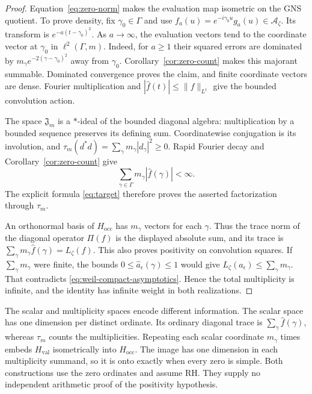 \documentclass[11pt]{article}
\theoremstyle{definition}
\theoremstyle{remark}
\numberwithin{equation}{section}
\newcommand{\cA}{\mathcal A}
\begin{document}
\begin{proof}
Equation~\eqref{eq:zero-norm} makes the evaluation map isometric on
the GNS quotient.  To prove density, fix $\gamma_0\in\Gamma$ and use
$f_a(u)=e^{-i\gamma_0u}g_a(u)\in\cA_\zeta$.
Its transform is $e^{-a(t-\gamma_0)^2}$.
As $a\to\infty$, the evaluation vectors tend to the coordinate vector
at $\gamma_0$ in $\ell^2(\Gamma,m)$.
Indeed, for $a\geq1$ their squared errors are dominated by
$m_\gamma e^{-2(\gamma-\gamma_0)^2}$ away from $\gamma_0$.
Corollary~\ref{cor:zero-count} makes this majorant summable.
Dominated convergence proves the claim, and finite coordinate vectors
are dense.  Fourier multiplication and
$|\widehat f(t)|\leq\|f\|_{L^1}$ give the bounded convolution action.

The space $\mathfrak J_m$ is a $*$-ideal of the bounded diagonal algebra:
multiplication by a bounded sequence preserves its defining sum.
Coordinatewise conjugation is its involution, and
$\tau_m(d^*d)=\sum_\gamma m_\gamma|d_\gamma|^2\geq0$.
Rapid Fourier decay and Corollary~\ref{cor:zero-count} give
\[
 \sum_{\gamma\in\Gamma}m_\gamma|\widehat f(\gamma)|<\infty.
\]
The explicit formula \eqref{eq:target} therefore proves the asserted
factorization through $\tau_m$.

An orthonormal basis of $H_{\mathrm{occ}}$ has $m_\gamma$ vectors for
each $\gamma$.  Thus the trace norm of the diagonal operator $\Pi(f)$
is the displayed absolute sum, and its trace is
$\sum_\gamma m_\gamma\widehat f(\gamma)=L_\zeta(f)$.
This also proves positivity on convolution squares.
If $\sum_\gamma m_\gamma$ were finite, the bounds
$0\leq\widehat a_\epsilon(\gamma)\leq1$ would give
$L_\zeta(a_\epsilon)\leq\sum_\gamma m_\gamma$.
That contradicts \eqref{eq:weil-compact-asymptotics}.
Hence the total multiplicity is infinite, and the identity has infinite
weight in both realizations.
\end{proof}

The scalar and multiplicity spaces encode different information.
The scalar space has one dimension per distinct ordinate.
Its ordinary diagonal trace is $\sum_\gamma\widehat f(\gamma)$,
whereas $\tau_m$ counts the multiplicities.
Repeating each scalar coordinate $m_\gamma$ times embeds
$H_{\mathrm{val}}$ isometrically into $H_{\mathrm{occ}}$.
The image has one dimension in each multiplicity summand, so it is
onto exactly when every zero is simple.
Both constructions use the zero ordinates and assume RH.
They supply no independent arithmetic proof of the positivity hypothesis.
\end{document}
